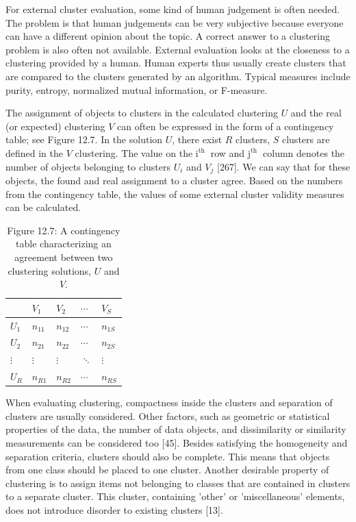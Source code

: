 \documentclass[10pt]{book}
\begin{document}
For external cluster evaluation, some kind of human judgement is often needed. The problem is that human judgements can be very subjective because everyone can have a different opinion about the topic. A correct answer to a clustering problem is also often not available. External evaluation looks at the closeness to a clustering provided by a human. Human experts thus usually create clusters that are compared to the clusters generated by an algorithm. Typical measures include purity, entropy, normalized mutual information, or F-measure.

The assignment of objects to clusters in the calculated clustering $U$ and the real (or expected) clustering $V$ can often be expressed in the form of a contingency table; see Figure 12.7. In the solution $U$, there exist $R$ clusters, $S$ clusters are defined in the $V$ clustering. The value on the $\mathrm{i}^{\text {th }}$ row and $\mathrm{j}^{\text {th }}$ column denotes the number of objects belonging to clusters $U_{i}$ and $V_{j}$ [267]. We can say that for these objects, the found and real assignment to a cluster agree. Based on the numbers from the contingency table, the values of some external cluster validity measures can be calculated.

\begin{table}[h]
\begin{center}
\begin{tabular}{l|llll}
 & $V_{1}$ & $V_{2}$ & $\cdots$ & $V_{S}$ \\
\hline
$U_{1}$ & $n_{11}$ & $n_{12}$ & $\cdots$ & $n_{1 S}$ \\
$U_{2}$ & $n_{21}$ & $n_{22}$ & $\cdots$ & $n_{2 S}$ \\
$\vdots$ & $\vdots$ & $\vdots$ & $\ddots$ & $\vdots$ \\
$U_{R}$ & $n_{R 1}$ & $n_{R 2}$ & $\cdots$ & $n_{R S}$ \\
\end{tabular}
\captionsetup{labelformat=empty}
\caption{Figure 12.7: A contingency table characterizing an agreement between two clustering solutions, $U$ and $V$.}
\end{center}
\end{table}

When evaluating clustering, compactness inside the clusters and separation of clusters are usually considered. Other factors, such as geometric or statistical properties of the data, the number of data objects, and dissimilarity or similarity measurements can be considered too [45]. Besides satisfying the homogeneity and separation criteria, clusters should also be complete. This means that objects from one class should be placed to one cluster. Another desirable property of clustering is to assign items not belonging to classes that are contained in clusters to a separate cluster. This cluster, containing 'other' or 'miscellaneous' elements, does not introduce disorder to existing clusters [13].
\end{document}
